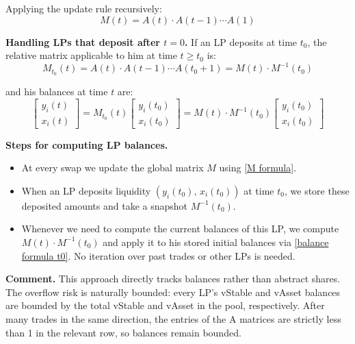 \documentclass{article}
\begin{document}
Applying the update rule recursively:
\begin{equation}\label{M formula}
M(t) = A(t) \cdot A(t-1) \cdots A(1)
\end{equation}

\medskip
\noindent\textbf{Handling LPs that deposit after $t = 0$.}
If an LP deposits at time $t_0$, the relative matrix applicable to him at time $t \geq t_0$
is:
\begin{equation}\label{M0 formula}
M_{t_0}(t) = A(t) \cdot A(t-1) \cdots A(t_0 + 1) = M(t) \cdot M^{-1}(t_0)
\end{equation}

and his balances at time $t$ are:
\begin{equation}\label{balance formula t0}
\begin{bmatrix} y_i(t) \\ x_i(t) \end{bmatrix}
= M_{t_0}(t) \begin{bmatrix} y_i(t_0) \\ x_i(t_0) \end{bmatrix}
= M(t) \cdot M^{-1}(t_0) \begin{bmatrix} y_i(t_0) \\ x_i(t_0) \end{bmatrix}
\end{equation}

\medskip
\noindent\textbf{Steps for computing LP balances.}
\begin{itemize}
\item At every swap we update the global matrix $M$ using \eqref{M formula}.

\item When an LP deposits liquidity $(y_i(t_0),\, x_i(t_0))$ at time $t_0$, we store these
      deposited amounts and take a snapshot $M^{-1}(t_0)$.

\item Whenever we need to compute the current balances of this LP, we compute $M(t)
      \cdot M^{-1}(t_0)$ and apply it to his stored initial balances via
      \eqref{balance formula t0}. No iteration over past trades or other LPs is needed.
\end{itemize}

\noindent\textbf{Comment.} This approach directly tracks balances rather than abstract
shares. The overflow risk is naturally bounded: every LP's vStable and vAsset balances
are bounded by the total vStable and vAsset in the pool, respectively. After many trades in
the same direction, the entries of the A matrices are strictly less than 1 in the relevant
row, so balances remain bounded.
\end{document}
